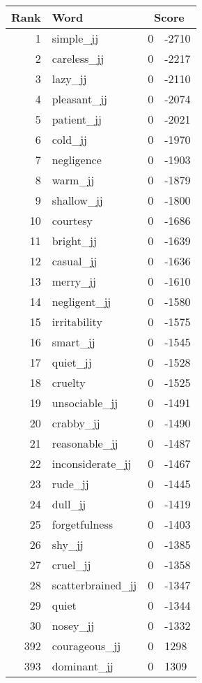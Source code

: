 \begin{longtable}[!htbp]{| rlr@{.}l |}
    \hline
    \textbf{Rank} & \textbf{Word} & \multicolumn{2}{c|}{\textbf{Score}} \\
    \hline
    \endhead
    1 & simple\_jj & 0 & -2710 \\
    2 & careless\_jj & 0 & -2217 \\
    3 & lazy\_jj & 0 & -2110 \\
    4 & pleasant\_jj & 0 & -2074 \\
    5 & patient\_jj & 0 & -2021 \\
    6 & cold\_jj & 0 & -1970 \\
    7 & negligence & 0 & -1903 \\
    8 & warm\_jj & 0 & -1879 \\
    9 & shallow\_jj & 0 & -1800 \\
    10 & courtesy & 0 & -1686 \\
    11 & bright\_jj & 0 & -1639 \\
    12 & casual\_jj & 0 & -1636 \\
    13 & merry\_jj & 0 & -1610 \\
    14 & negligent\_jj & 0 & -1580 \\
    15 & irritability & 0 & -1575 \\
    16 & smart\_jj & 0 & -1545 \\
    17 & quiet\_jj & 0 & -1528 \\
    18 & cruelty & 0 & -1525 \\
    19 & unsociable\_jj & 0 & -1491 \\
    20 & crabby\_jj & 0 & -1490 \\
    21 & reasonable\_jj & 0 & -1487 \\
    22 & inconsiderate\_jj & 0 & -1467 \\
    23 & rude\_jj & 0 & -1445 \\
    24 & dull\_jj & 0 & -1419 \\
    25 & forgetfulness & 0 & -1403 \\
    26 & shy\_jj & 0 & -1385 \\
    27 & cruel\_jj & 0 & -1358 \\
    28 & scatterbrained\_jj & 0 & -1347 \\
    29 & quiet & 0 & -1344 \\
    30 & nosey\_jj & 0 & -1332 \\
    392 & courageous\_jj & 0 & 1298 \\
    393 & dominant\_jj & 0 & 1309 \\

\end{longtable}

